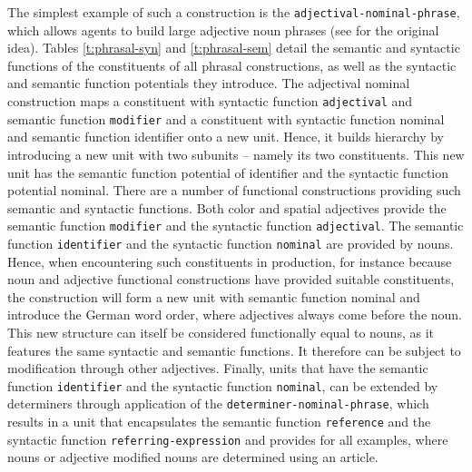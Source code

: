 The simplest example of such a construction is the {\footnotesize\tt adjectival-nominal-phrase}, which allows agents to build large adjective noun phrases 
(see \citealp{steels2011phrasal} for the original idea). 
Tables \ref{t:phrasal-syn} 
and \ref{t:phrasal-sem} detail the semantic and syntactic functions of 
the constituents of all phrasal constructions, as well as the syntactic 
and semantic function potentials they introduce. The adjectival 
nominal construction maps a constituent with syntactic 
function {\footnotesize\tt adjectival} and semantic function {\footnotesize\tt modifier} and a constituent with syntactic function nominal and semantic function identifier onto a new unit. Hence, it builds hierarchy by introducing a new unit with two subunits -- 
namely its two constituents. This new unit has the semantic function potential of identifier and the syntactic function 
potential nominal. There are a number of functional constructions providing such semantic and syntactic 
functions. Both color and spatial adjectives provide the semantic function {\footnotesize\tt modifier} and the syntactic
function {\footnotesize\tt adjectival}. The semantic function {\footnotesize\tt identifier} and the syntactic function {\footnotesize\tt nominal} are provided by nouns. Hence, when encountering such constituents in production, for instance because noun and adjective functional constructions have provided suitable constituents, the construction will form a new unit with semantic function 
nominal and introduce the German word order, where adjectives always come before the 
noun. This new structure can itself be considered functionally equal to nouns, as it features the same syntactic and 
semantic functions. It therefore can be subject to modification through other adjectives. Finally, units that have the
semantic function {\footnotesize\tt identifier} and the syntactic function {\footnotesize\tt nominal},
can be extended by determiners through application of the {\footnotesize\tt determiner-nominal-phrase}, which results in a unit that encapsulates the semantic function 
{\footnotesize\tt reference} and the syntactic function {\footnotesize\tt referring-expression} and
provides for all examples, where nouns or adjective modified nouns are determined
using an article.
